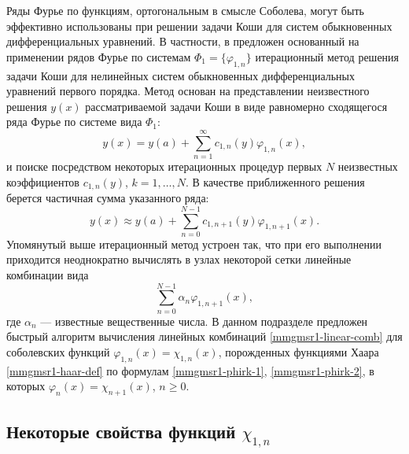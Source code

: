 Ряды Фурье по функциям, ортогональным в смысле Соболева, могут быть эффективно использованы при решении задачи Коши для систем обыкновенных дифференциальных уравнений. В частности, в \cite{mmgmsr1-ShaOdeDemi2017,mmgmsr1-ShaMagOdeCos2017,mmgmsr1-SMS-SHTI-Demi2017,mmgmsr1-SHII-MSR-Demi2017} предложен основанный на применении рядов Фурье по системам $\Phi_1=\{\varphi_{1,n}\}$ итерационный метод решения задачи Коши для нелинейных систем обыкновенных дифференциальных уравнений первого порядка. Метод основан на представлении неизвестного решения $y(x)$ рассматриваемой задачи Коши в виде равномерно сходящегося ряда Фурье по системе вида $\Phi_1$:
\begin{equation*}
y(x) = y(a)+\sum\limits_{n=1}^{\infty}
c_{1,n}(y)\varphi_{1,n}(x),
\end{equation*}
и поиске посредством некоторых итерационных процедур первых $N$ неизвестных коэффициентов $c_{1,n}(y)$, $k=1,\ldots,N$. В качестве приближенного решения берется частичная сумма указанного ряда:
\begin{equation}\label{mmgmsr1-y-part-sum}
y(x) \approx y(a)+\sum\limits_{n=0}^{N-1}
c_{1,n+1}(y)\varphi_{1,n+1}(x).
\end{equation}
Упомянутый выше итерационный метод устроен так, что при его выполнении приходится неоднократно вычислять в узлах некоторой сетки линейные комбинации вида
\begin{equation}\label{mmgmsr1-linear-comb}
\sum\limits_{n=0}^{N-1}\alpha_n\varphi_{1,n+1}(x),
\end{equation}
где $\alpha_n$ --- известные вещественные числа. В данном подразделе предложен быстрый алгоритм вычисления линейных комбинаций \eqref{mmgmsr1-linear-comb} для соболевских функций $\varphi_{1,n}(x)=\chi_{1,n}(x)$, порожденных функциями Хаара \eqref{mmgmsr1-haar-def} по формулам \eqref{mmgmsr1-phirk-1}, \eqref{mmgmsr1-phirk-2}, в которых $\varphi_n(x) = \chi_{n+1}(x)$, $n \ge 0$.

\subsection{Некоторые свойства функций $\chi_{1,n}$}

